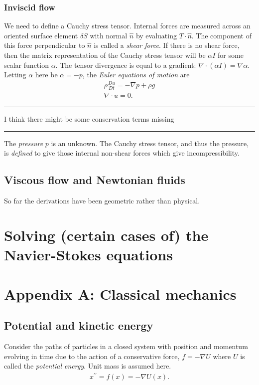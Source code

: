 \documentclass{article}
\newcommand{\ppr}{{\prime\prime}}
\newcommand{\todo}[1]{\vskip 0.1in \hrule \vskip 0.03in {#1} \vskip 0.03in \hrule \vskip 0.1in}
\begin{document}
\subsubsection{Inviscid flow}
We need to define a Cauchy stress tensor. Internal forces are measured across an oriented surface element $\delta S$ with normal $\hat{n}$ by evaluating
$T\cdot \hat{n}$. The component of this force perpendicular to $\hat{n}$ is called a \textit{shear force}.
If there is no shear force, then the matrix representation of the Cauchy stress tensor will be $\alpha I$ for some scalar function $\alpha$.
The tensor divergence is equal to a gradient: $\nabla \cdot \left(\alpha I\right) = \nabla \alpha$. Letting $\alpha$ here be $\alpha = -p$,
the \textit{Euler equations of motion} are
\begin{equation}\label{Euler}
\begin{split}
    \rho \frac{Du}{Dt} = -\nabla p + \rho g \\
    \nabla \cdot u = 0.
\end{split}
\end{equation}
\todo{I think there might be some conservation terms missing}
The \textit{pressure} $p$ is an unknown. The Cauchy stress tensor, and thus the pressure, is \textit{defined} to give those internal non-shear forces
which give incompressibility.
\subsection{Viscous flow and Newtonian fluids} %
So far the derivations have been geometric rather than physical.


\section{Solving (certain cases of) the Navier-Stokes equations}


\section{Appendix A: Classical mechanics}
\subsection{Potential and kinetic energy} %
Consider the paths of particles in a closed system with position and momentum evolving in time
due to the action of a conservative force, $f = -\nabla U$ where $U$ is called the \textit{potential energy}.
Unit mass is assumed here.
\begin{equation}
\begin{split}
    x^\ppr = f(x) = -\nabla U(x).
\end{split}
\end{equation}
\end{document}
